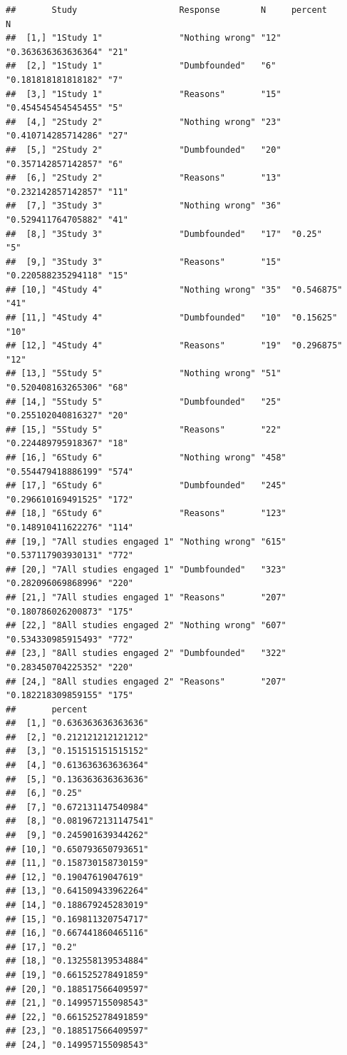 \documentclass[
  american,
  man,floatsintext]{apa7}
\begin{document}
\begin{verbatim}
##       Study                    Response        N     percent             N    
##  [1,] "1Study 1"               "Nothing wrong" "12"  "0.363636363636364" "21" 
##  [2,] "1Study 1"               "Dumbfounded"   "6"   "0.181818181818182" "7"  
##  [3,] "1Study 1"               "Reasons"       "15"  "0.454545454545455" "5"  
##  [4,] "2Study 2"               "Nothing wrong" "23"  "0.410714285714286" "27" 
##  [5,] "2Study 2"               "Dumbfounded"   "20"  "0.357142857142857" "6"  
##  [6,] "2Study 2"               "Reasons"       "13"  "0.232142857142857" "11" 
##  [7,] "3Study 3"               "Nothing wrong" "36"  "0.529411764705882" "41" 
##  [8,] "3Study 3"               "Dumbfounded"   "17"  "0.25"              "5"  
##  [9,] "3Study 3"               "Reasons"       "15"  "0.220588235294118" "15" 
## [10,] "4Study 4"               "Nothing wrong" "35"  "0.546875"          "41" 
## [11,] "4Study 4"               "Dumbfounded"   "10"  "0.15625"           "10" 
## [12,] "4Study 4"               "Reasons"       "19"  "0.296875"          "12" 
## [13,] "5Study 5"               "Nothing wrong" "51"  "0.520408163265306" "68" 
## [14,] "5Study 5"               "Dumbfounded"   "25"  "0.255102040816327" "20" 
## [15,] "5Study 5"               "Reasons"       "22"  "0.224489795918367" "18" 
## [16,] "6Study 6"               "Nothing wrong" "458" "0.554479418886199" "574"
## [17,] "6Study 6"               "Dumbfounded"   "245" "0.296610169491525" "172"
## [18,] "6Study 6"               "Reasons"       "123" "0.148910411622276" "114"
## [19,] "7All studies engaged 1" "Nothing wrong" "615" "0.537117903930131" "772"
## [20,] "7All studies engaged 1" "Dumbfounded"   "323" "0.282096069868996" "220"
## [21,] "7All studies engaged 1" "Reasons"       "207" "0.180786026200873" "175"
## [22,] "8All studies engaged 2" "Nothing wrong" "607" "0.534330985915493" "772"
## [23,] "8All studies engaged 2" "Dumbfounded"   "322" "0.283450704225352" "220"
## [24,] "8All studies engaged 2" "Reasons"       "207" "0.182218309859155" "175"
##       percent             
##  [1,] "0.636363636363636" 
##  [2,] "0.212121212121212" 
##  [3,] "0.151515151515152" 
##  [4,] "0.613636363636364" 
##  [5,] "0.136363636363636" 
##  [6,] "0.25"              
##  [7,] "0.672131147540984" 
##  [8,] "0.0819672131147541"
##  [9,] "0.245901639344262" 
## [10,] "0.650793650793651" 
## [11,] "0.158730158730159" 
## [12,] "0.19047619047619"  
## [13,] "0.641509433962264" 
## [14,] "0.188679245283019" 
## [15,] "0.169811320754717" 
## [16,] "0.667441860465116" 
## [17,] "0.2"               
## [18,] "0.132558139534884" 
## [19,] "0.661525278491859" 
## [20,] "0.188517566409597" 
## [21,] "0.149957155098543" 
## [22,] "0.661525278491859" 
## [23,] "0.188517566409597" 
## [24,] "0.149957155098543"
\end{verbatim}
\end{document}
